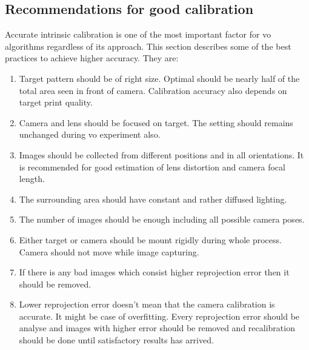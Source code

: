 \subsection{Recommendations for good calibration}
Accurate intrinsic calibration is one of the most important factor for \acrshort{vo} algorithms regardless of its approach. This section describes some of the best practices to achieve higher accuracy. They are:
\begin{enumerate}
	\item Target pattern should be of right size. Optimal should be nearly half of the total area seen in front of camera. Calibration accuracy also depends on target print quality.
	\item Camera and lens should be focused on target. The setting should remains unchanged during \acrshort{vo} experiment also. 
	\item Images should be collected from different positions and in all orientations. It is recommended for good estimation of lens distortion and camera focal length.
	\item The surrounding area should have constant and rather diffused lighting. 
	\item The number of images should be enough including all possible camera poses.
	\item Either target or camera should be mount rigidly during whole process. Camera should not move while image capturing.
	\item If there is any bad images which consist higher reprojection error then it should be removed.
	\item Lower reprojection error doesn't mean that the camera calibration is accurate. It might be case of overfitting. Every reprojection error should be analyse and images with higher error should be removed and recalibration should be done until satisfactory results has arrived.
\end{enumerate}

